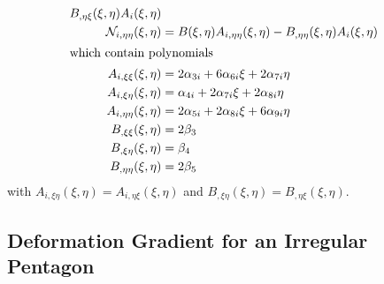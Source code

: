 \begin{subequations}
\begin{align}
	B_{,\eta\xi} (\xi,\eta) A_i (\xi,\eta)  \\
	\mathcal{N}_{i,\eta\eta} (\xi,\eta) & = B(\xi,\eta) A_{i,\eta\eta} (\xi,\eta) -
	B_{,\eta\eta} (\xi,\eta) A_{i} (\xi,\eta) \\
	\intertext{which contain polynomials}
	A_{i,\xi\xi} (\xi,\eta) & = 2 \alpha_{3i} + 6 \alpha_{6i} \xi + 2 \alpha_{7i} \eta \\
	A_{i,\xi\eta} (\xi,\eta) & = \alpha_{4i} + 2 \alpha_{7i} \xi + 2 \alpha_{8i} \eta \\
	A_{i,\eta\eta} (\xi,\eta) & = 2 \alpha_{5i} + 2 \alpha_{8i} \xi + 6 \alpha_{9i} \eta \\
	B_{,\xi\xi} (\xi,\eta) & = 2 \beta_3 \\
	B_{,\xi\eta} (\xi,\eta) & = \beta_4 \\
	B_{,\eta\eta} (\xi,\eta) & = 2 \beta_5
	\end{align}
\end{subequations}
with $A_{i,\xi\eta} (\xi,\eta) = A_{i,\eta\xi} (\xi,\eta)$ and $B_{,\xi\eta} (\xi,\eta) = B_{,\eta\xi} (\xi,\eta)$. 

\subsection{Deformation Gradient for an Irregular Pentagon}

